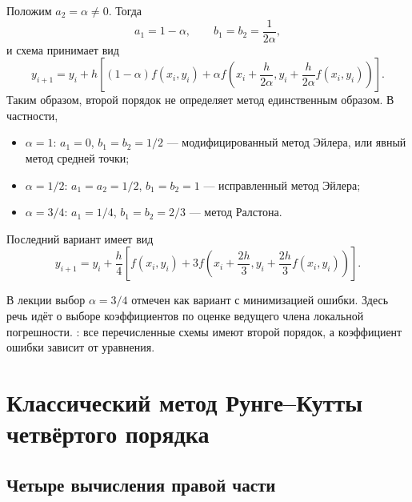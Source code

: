 \documentclass[../final.tex]{subfiles}
\begin{document}
Положим $a_2=\alpha\ne0$. Тогда
\begin{equation*}
    a_1=1-\alpha,\qquad b_1=b_2=\frac{1}{2\alpha},
\end{equation*}
и схема принимает вид
\begin{equation*}
    y_{i+1}=y_i+h\left[(1-\alpha)f(x_i,y_i)
    +\alpha f\!\left(x_i+\frac{h}{2\alpha},
    y_i+\frac{h}{2\alpha}f(x_i,y_i)\right)\right].
\end{equation*}
Таким образом, второй порядок не определяет метод единственным образом.
В частности,
\begin{itemize}
    \item $\alpha=1$: $a_1=0$, $b_1=b_2=1/2$ ---
    модифицированный метод Эйлера, или явный метод средней точки;
    \item $\alpha=1/2$: $a_1=a_2=1/2$, $b_1=b_2=1$ ---
    исправленный метод Эйлера;
    \item $\alpha=3/4$: $a_1=1/4$, $b_1=b_2=2/3$ ---
    метод Ралстона.
\end{itemize}
Последний вариант имеет вид
\begin{equation*}
    y_{i+1}=y_i+\frac h4\left[
    f(x_i,y_i)+3f\!\left(x_i+\frac{2h}{3},
    y_i+\frac{2h}{3}f(x_i,y_i)\right)\right].
\end{equation*}

\remark
В лекции выбор $\alpha=3/4$ отмечен как вариант с минимизацией
ошибки. Здесь речь идёт о выборе коэффициентов по оценке ведущего
члена локальной погрешности. : все перечисленные схемы
имеют второй порядок, а коэффициент ошибки зависит от уравнения.

\section{Классический метод Рунге--Кутты четвёртого порядка}

\subsection{Четыре вычисления правой части}
\end{document}
